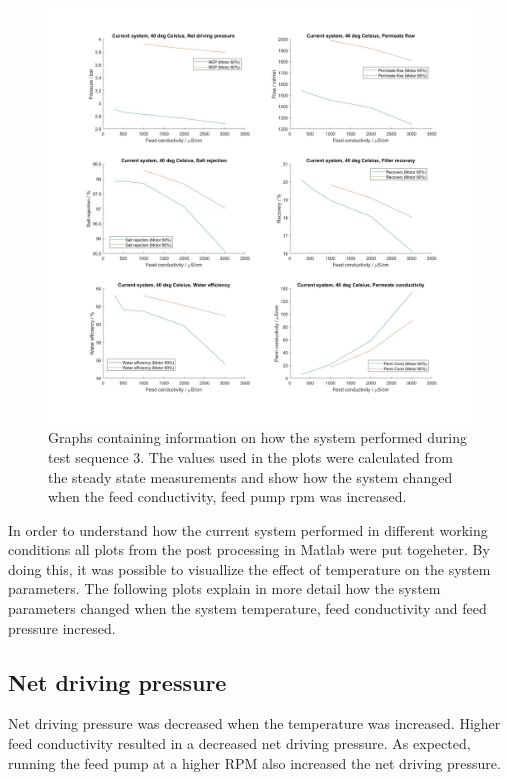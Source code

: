 \begin{figure}[H]
    \centering
    \includegraphics[width=1.1\textwidth]{Key40}
    \caption{Graphs containing information on how the system performed during test sequence 3. The values used in the plots were calculated from the steady state measurements and show how the system changed when the feed conductivity, feed pump rpm was increased.}
    \label{fig:K40}
\end{figure}

\newpage

In order to understand how the current system performed in different working conditions all plots from the post processing in Matlab were put togeheter. By doing this, it was possible to visuallize the effect of temperature on the system parameters. The following plots explain in more detail how the system parameters changed when the system temperature, feed conductivity and feed pressure incresed.  

\subsection{Net driving pressure}

Net driving pressure was decreased when the temperature was increased. Higher feed conductivity resulted in a decreased net driving pressure. As expected, running the feed pump at a higher RPM also increased the net driving pressure.

